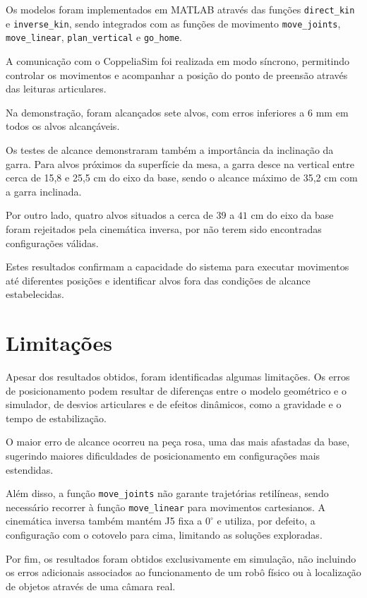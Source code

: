 Os modelos foram implementados em MATLAB através das funções \texttt{direct\_kin} e \texttt{inverse\_kin}, sendo integrados com as funções de movimento \texttt{move\_joints}, \texttt{move\_linear}, \texttt{plan\_vertical} e \texttt{go\_home}.

A comunicação com o CoppeliaSim foi realizada em modo síncrono, permitindo controlar os movimentos e acompanhar a posição do ponto de preensão através das leituras articulares.

Na demonstração, foram alcançados sete alvos, com erros inferiores a $6$ mm em todos os alvos alcançáveis.

Os testes de alcance demonstraram também a importância da inclinação da garra. Para alvos próximos da superfície da mesa, a garra desce na vertical entre cerca de 15,8 e 25,5 cm do eixo da base, sendo o alcance máximo de 35,2 cm com a garra inclinada.

Por outro lado, quatro alvos situados a cerca de $39$ a $41$ cm do eixo da base foram rejeitados pela cinemática inversa, por não terem sido encontradas configurações válidas.

Estes resultados confirmam a capacidade do sistema para executar movimentos até diferentes posições e identificar alvos fora das condições de alcance estabelecidas.

\section*{Limitações}

Apesar dos resultados obtidos, foram identificadas algumas limitações. Os erros de posicionamento podem resultar de diferenças entre o modelo geométrico e o simulador, de desvios articulares e de efeitos dinâmicos, como a gravidade e o tempo de estabilização.

O maior erro de alcance ocorreu na peça rosa, uma das mais afastadas da base, sugerindo maiores dificuldades de posicionamento em configurações mais estendidas.

Além disso, a função \texttt{move\_joints} não garante trajetórias retilíneas, sendo necessário recorrer à função \texttt{move\_linear} para movimentos cartesianos. A cinemática inversa também mantém J5 fixa a $0^\circ$ e utiliza, por defeito, a configuração com o cotovelo para cima, limitando as soluções exploradas.

Por fim, os resultados foram obtidos exclusivamente em simulação, não incluindo os erros adicionais associados ao funcionamento de um robô físico ou à localização de objetos através de uma câmara real.

